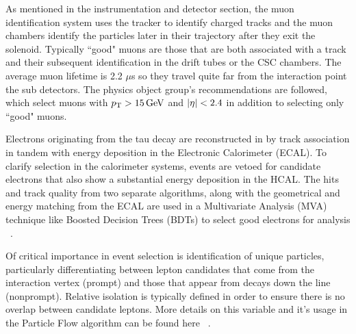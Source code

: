 
As mentioned in the instrumentation and detector section, the muon identification system uses the tracker to identify charged tracks and the muon chambers identify the particles later in their trajectory after they exit the solenoid. Typically ``good" muons are those that are both associated with a track and their subsequent identification in the drift tubes or the CSC chambers. The average muon lifetime is 2.2 $\mu$s so they travel quite far from the interaction point the sub detectors.  The physics object group's recommendations are followed, which select muons with $p_{\mathrm{T}}>15\,\text{Ge\hspace{-.08em}V}$ and $\lvert \eta \rvert<2.4$ in addition to selecting only ``good" muons.



Electrons originating from the tau decay are reconstructed in by track association in tandem with energy deposition in the Electronic Calorimeter (ECAL). To clarify selection in the calorimeter systems, events are vetoed for candidate electrons that also show a substantial energy deposition in the HCAL. The hits and track quality from two separate algorithms, along with the geometrical and energy matching from the ECAL are used in a Multivariate Analysis (MVA) technique like Boosted Decision Trees (BDTs) to select good electrons for analysis 
~\cite{Khachatryan:2015hwa}.


Of critical importance in event selection is identification of unique particles, particularly differentiating between lepton candidates that come from the interaction vertex (prompt) and those that appear from decays down the line (nonprompt). Relative isolation is typically defined in order to ensure there is no overlap between candidate leptons. More details on this variable and it's usage in the Particle Flow algorithm can be found here  ~\cite{Sirunyan_2017}. 

